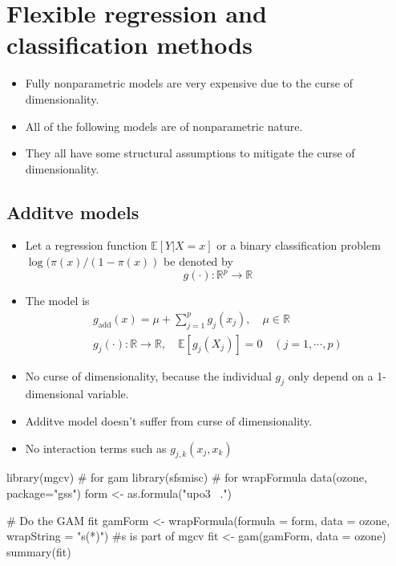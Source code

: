 \section{Flexible regression and classification methods}
\begin{application}
 \begin{itemize}
  \item Fully nonparametric models are very expensive due to the curse of dimensionality.
  \item All of the following models are of nonparametric nature.
  \item They all have some structural assumptions to mitigate the curse of dimensionality.
 \end{itemize}
\end{application}
\subsection{Additve models}
\begin{theory}
\begin{itemize}
 \item Let a regression function $\mathbb{E}[Y|X = x]$ or a binary classification problem $\log(\pi(x)/(1-\pi(x))$ be denoted by 
 \begin{equation*}
  g(\cdot):\mathbb{R}^p\rightarrow\mathbb{R}
 \end{equation*}
 \item The model is
 \begin{gather*}
  g_{\text{add}}(x) = \mu + \sum_{j=1}^p g_j(x_j), \quad\mu\in\mathbb{R}\\
  g_j(\cdot): \mathbb{R}\rightarrow\mathbb{R},\quad\mathbb{E}[g_j(X_j)] = 0\quad (j=1,\cdots,p)
 \end{gather*}
 \item No curse of dimensionality, because the individual $g_j$ only depend on a 1-dimensional variable.
\end{itemize}
\end{theory}
\begin{application}
\begin{itemize}
 \item[\leftthumbsup] Additve model doesn't suffer from curse of dimensionality.
 \item[\leftthumbsdown] No interaction terms such as $g_{j,k}(x_j, x_k)$ 
\end{itemize}
\end{application}

\begin{code}
 library(mgcv) # for gam
 library(sfsmisc) # for wrapFormula
 data(ozone, package="gss")
 form <- as.formula("upo3 ~.")
 
 # Do the GAM fit
 gamForm <- wrapFormula(formula = form, data = ozone, wrapString = "s(*)") #s is part of mgcv
 fit <- gam(gamForm, data = ozone) 
 summary(fit)
\end{code}

